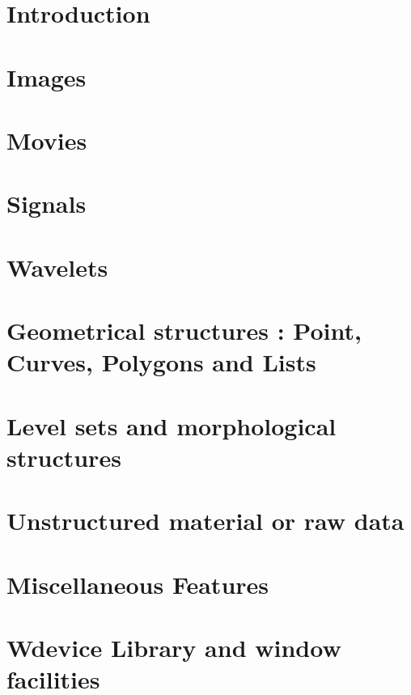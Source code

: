 \documentclass[a4paper, 12pt]{book}
\begin{document}


\tableofcontents
\newpage

\chapter{Introduction}
\label{intro}

\newpage

\chapter{Images}
\label{images}

\newpage

\chapter{Movies}
\label{movies}

\newpage

\chapter{Signals}
\label{signals}

\newpage

\chapter{Wavelets}
\label{wavelets}

\newpage

\chapter{Geometrical structures : Point, Curves, Polygons and Lists}
\label{curves-polygons}

\newpage

\chapter{Level sets and morphological structures}
\label{morpho}

\newpage

\chapter{Unstructured material or raw data}
\label{rawdata}

\newpage

\chapter{Miscellaneous Features}
\label{miscellaneous}

\newpage

\chapter{Wdevice Library and window facilities}
\label{wdevice}

\newpage

\printindex
\end{document}
